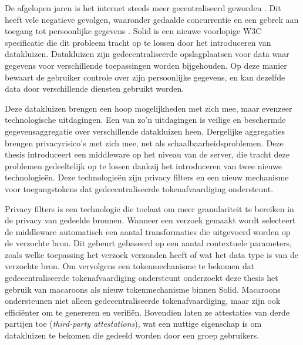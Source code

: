 \begin{abstract*}
  De afgelopen jaren is het internet steeds meer gecentraliseerd geworden \citep{internet-report}. Dit heeft vele negatieve gevolgen, waaronder gedaalde concurrentie en een gebrek aan toegang tot persoonlijke gegevens \citep{big-tech-innovation, platform-monopolies}. Solid \citep{solid} is een nieuwe voorlopige W3C specificatie die dit probleem tracht op te lossen door het introduceren van datakluizen. Datakluizen zijn gedecentraliseerde opslagplaatsen voor data waar gegevens voor verschillende toepassingen worden bijgehouden. Op deze manier bewaart de gebruiker controle over zijn persoonlijke gegevens, en kan dezelfde data door verschillende diensten gebruikt worden.
  
  Deze datakluizen brengen een hoop mogelijkheden met zich mee, maar evenzeer technologische uitdagingen. Een van zo'n uitdagingen is veilige en beschermde gegevensaggregatie over verschillende datakluizen heen. Dergelijke aggregaties brengen privacyrisico's met zich mee, net als schaalbaarheidsproblemen. Deze thesis introduceert een middleware op het niveau van de server, die tracht deze problemen gedeeltelijk op te lossen dankzij het introduceren van twee nieuwe technologie{\"e}n. Deze technologie{\"e}n zijn privacy filters en een nieuw mechanisme voor toegangstokens dat gedecentraliseerde tokenafvaardiging ondersteunt.

  Privacy filters is een technologie die toelaat om meer granulariteit te bereiken in de privacy van gedeelde bronnen. Wanneer een verzoek gemaakt wordt selecteert de middleware automatisch een aantal transformaties die uitgevoerd worden op de verzochte bron. Dit gebeurt gebaseerd op een aantal contextuele parameters, zoals welke toepassing het verzoek verzonden heeft of wat het data type is van de verzochte bron. Om vervolgens een tokenmechanisme te bekomen dat gedecentraliseerde tokenafvaardiging ondersteunt onderzoekt deze thesis het gebruik van macaroons als nieuw tokenmechanisme binnen Solid. Macaroons ondersteunen niet alleen gedecentraliseerde tokenafvaardiging, maar zijn ook effici{\"e}nter om te genereren en verifi{\"e}n. Bovendien laten ze attestaties van derde partijen toe (\textit{third-party attestations}), wat een nuttige eigenschap is om datakluizen te bekomen die gedeeld worden door een groep gebruikers.
  

\end{abstract*}
